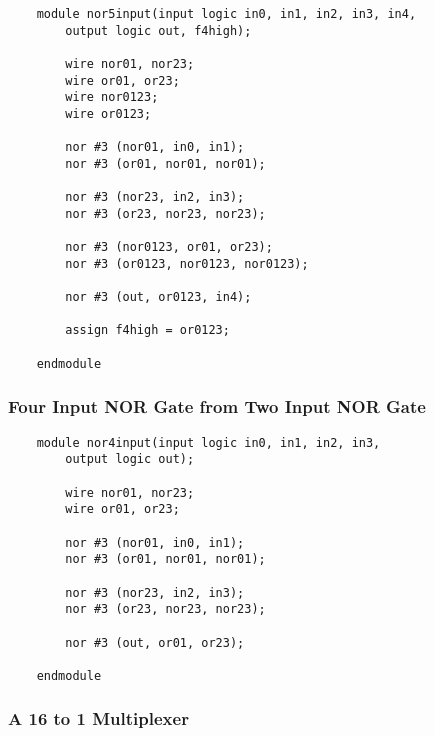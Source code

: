 \documentclass[../main]{subfiles}
\begin{document}
\begin{verbatim}
    module nor5input(input logic in0, in1, in2, in3, in4,
        output logic out, f4high);

        wire nor01, nor23;
        wire or01, or23;
        wire nor0123;
        wire or0123;

        nor #3 (nor01, in0, in1);
        nor #3 (or01, nor01, nor01);

        nor #3 (nor23, in2, in3);
        nor #3 (or23, nor23, nor23);

        nor #3 (nor0123, or01, or23);
        nor #3 (or0123, nor0123, nor0123);

        nor #3 (out, or0123, in4);

        assign f4high = or0123;

    endmodule
\end{verbatim}

\subsubsection {Four Input NOR Gate from Two Input NOR Gate}

\begin{verbatim}
    module nor4input(input logic in0, in1, in2, in3,
        output logic out);

        wire nor01, nor23;
        wire or01, or23;

        nor #3 (nor01, in0, in1);
        nor #3 (or01, nor01, nor01);

        nor #3 (nor23, in2, in3);
        nor #3 (or23, nor23, nor23);

        nor #3 (out, or01, or23);

    endmodule
\end{verbatim}


\subsubsection {A 16 to 1 Multiplexer}
\end{document}
